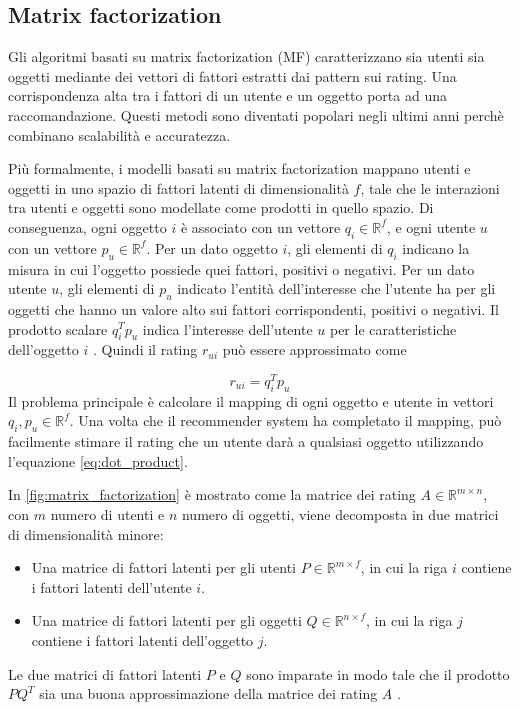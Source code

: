 \subsection{Matrix factorization} \label{ssec:mf}
Gli algoritmi basati su matrix factorization (MF) caratterizzano sia utenti sia oggetti mediante dei vettori di fattori estratti dai pattern sui rating. Una corrispondenza alta tra i fattori di un utente e un oggetto porta ad una raccomandazione. Questi metodi sono diventati popolari negli ultimi anni perchè combinano scalabilità e accuratezza.

Più formalmente, i modelli basati su matrix factorization mappano utenti e oggetti in uno spazio di fattori latenti di dimensionalità $f$, tale che le interazioni tra utenti e oggetti sono modellate come prodotti in quello spazio. Di conseguenza, ogni oggetto $i$ è associato con un vettore $q_i \in \mathbb{R}^f$, e ogni utente $u$ con un vettore $p_u \in \mathbb{R}^f$. Per un dato oggetto $i$, gli elementi di $q_i$ indicano la misura in cui l'oggetto possiede quei fattori, positivi o negativi. Per un dato utente $u$, gli elementi di $p_u$ indicato l'entità dell'interesse che l'utente ha per gli oggetti che hanno un valore alto sui fattori corrispondenti, positivi o negativi. Il prodotto scalare $q_i^Tp_u$ indica l'interesse dell'utente $u$ per le caratteristiche dell'oggetto $i$ \cite{matrix-factorization}. Quindi il rating $r_{ui}$ può essere approssimato come

\begin{equation} \label{eq:dot_product}
r_{ui} = q_i^Tp_u
\end{equation}
Il problema principale è calcolare il mapping di ogni oggetto e utente in vettori $q_i, p_u \in \mathbb{R}^f$. Una volta che il recommender system ha completato il mapping, può facilmente stimare il rating che un utente darà a qualsiasi oggetto utilizzando l'equazione \ref{eq:dot_product}. 

In \autoref{fig:matrix_factorization} è mostrato come la matrice dei rating $A \in \mathbb{R}^{m \times n}$, con $m$ numero di utenti e $n$ numero di oggetti, viene decomposta in due matrici di dimensionalità minore:

\begin{itemize}
	\item Una matrice di fattori latenti per gli utenti $P \in \mathbb{R}^{m \times f}$, in cui la riga $i$ contiene i fattori latenti dell'utente $i$.
	\item Una matrice di fattori latenti per gli oggetti $Q \in \mathbb{R}^{n \times f}$, in cui la riga $j$ contiene i fattori latenti dell'oggetto $j$.
\end{itemize}
Le due matrici di fattori latenti $P$ e $Q$ sono imparate in modo tale che il prodotto $PQ^T$ sia una buona approssimazione della matrice dei rating $A$ \cite{mf-google}.

